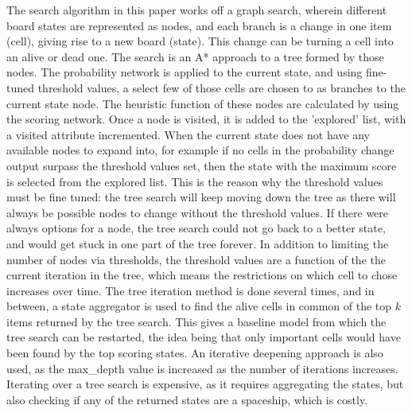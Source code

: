 \documentclass{l4proj}
\begin{document}
The search algorithm in this paper works off a graph search, wherein different board states are represented as nodes, and each branch is a change in one item (cell), giving rise to a new board (state). This change can be turning a cell into an alive or dead one. The search is an A* approach to a tree formed by those nodes. The probability network is applied to the current state, and using fine-tuned threshold values, a select few of those cells are chosen to as branches to the current state node. The heuristic function of these nodes are calculated by using the scoring network. Once a node is visited, it is added to the 'explored' list, with a visited attribute incremented. When the current state does not have any available nodes to expand into, for example if no cells in the probability change output surpass the threshold values set, then the state with the maximum score is selected from the explored list. This is the reason why the threshold values must be fine tuned: the tree search will keep moving down the tree as there will always be possible nodes to change without the threshold values. If there were always options for a node, the tree search could not go back to a better state, and would get stuck in one part of the tree forever. In addition to limiting the number of nodes via thresholds, the threshold values are a function of the the current iteration in the tree, which means the restrictions on which cell to chose increases over time. The tree iteration method is done several times, and in between, a state aggregator is used to find the alive cells in common of the top $k$ items returned by the tree search. This gives a baseline model from which the tree search can be restarted, the idea being that only important cells would have been found by the top scoring states. An iterative deepening approach is also used, as the max\_depth value is increased as the number of iterations increases. Iterating over a tree search is expensive, as it requires aggregating the states, but also checking if any of the returned states are a spaceship, which is costly.
\end{document}
